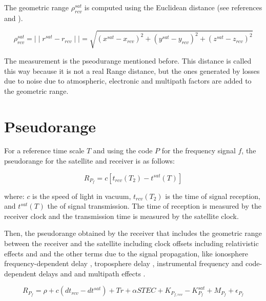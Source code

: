 The geometric range $\rho_{rcv}^{sat}$ is computed using the Euclidean distance (see references  and ).

\begin{equation}\label{Geometric Range}
    \rho_{rcv}^{sat} = \mid\mid r^{sat}-r_{rcv} \mid\mid = 
\sqrt{\left(x^{sat}-x_{rcv}\right)^{2}+\left(y^{sat}-y_{rcv}\right)^{2}+\left(z^{sat}-z_{rcv}\right)^{2}}
\end{equation}

The measurement  is the pseodurange mentioned before. This distance is called this way because it is not a real Range distance, but the ones generated by losses due to noise due to atmospheric, electronic and multipath factors are added to the geometric range.

\section{Pseudorange}
For a reference time scale $T$ and using the code $P$ for the frequency signal $f$, the pseudorange for the satellite and receiver is as follows:

\begin{equation}\label{Simple Pseudorange}
    R_{P_{f}} = c\left[t_{rcv}\left(T_{2}\right)-t^{sat} \left(T_{}\right)\right]
\end{equation}

where: $c$ is the speed of light in vacuum, $t_{rcv}\left(T_{2}\right)$ is the time of signal reception, and $t^{sat} \left(T_{}\right)$ the of signal transmission. The time of reception is measured by the receiver clock and the transmission time is measured by the satellite clock.


Then, the pseudorange  obtained by the receiver that includes the \vartext{\rho} geometric range between the receiver and the satellite including clock offsets including relativistic effects  and  and the other terms due to the signal propagation, like ionosphere frequency-dependent delay , troposphere delay , instrumental frequency and code-dependent delays  and  and multipath effects .



\begin{equation}\label{Pseudorange}
    R_{P_{f}} = \rho + c \left( dt_{rcv} - dt^{sat} \right) + Tr + \alpha STEC + K_{P_{f,rcv}} - K_{P_{f}}^{sat} + M_{P_{f}} + \epsilon _{P_{f}}
\end{equation}


